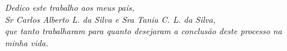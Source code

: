 \begin{dedicatoria}
   \vspace*{\fill}
   \begin{flushright}
   	\textit{Dedico este trabalho aos meus pais, \\ Sr Carlos Alberto L. da Silva e Sra Tania C. L. da Silva, \\ que tanto trabalharam para quanto desejaram a conclusão deste processo na minha vida.}
   	
   \end{flushright}
\end{dedicatoria}
